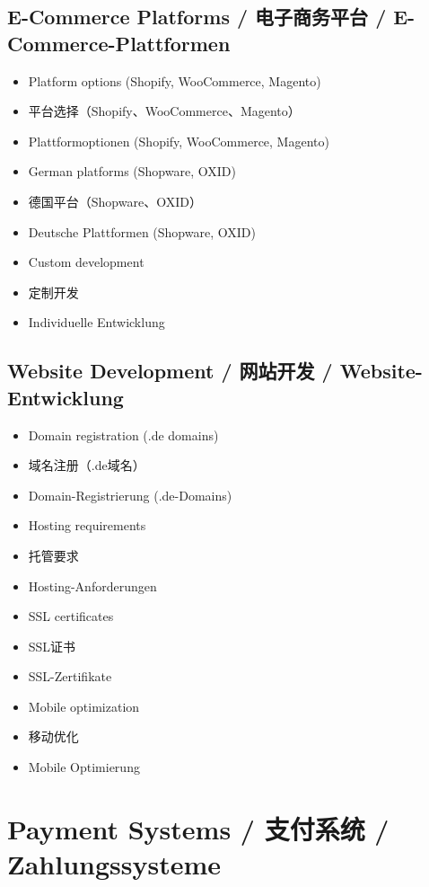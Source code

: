 \subsection{E-Commerce Platforms / 电子商务平台 / E-Commerce-Plattformen}
\begin{itemize}
    \item Platform options (Shopify, WooCommerce, Magento)
    \item 平台选择（Shopify、WooCommerce、Magento）
    \item Plattformoptionen (Shopify, WooCommerce, Magento)
    \item German platforms (Shopware, OXID)
    \item 德国平台（Shopware、OXID）
    \item Deutsche Plattformen (Shopware, OXID)
    \item Custom development
    \item 定制开发
    \item Individuelle Entwicklung
\end{itemize}

\subsection{Website Development / 网站开发 / Website-Entwicklung}
\begin{itemize}
    \item Domain registration (.de domains)
    \item 域名注册（.de域名）
    \item Domain-Registrierung (.de-Domains)
    \item Hosting requirements
    \item 托管要求
    \item Hosting-Anforderungen
    \item SSL certificates
    \item SSL证书
    \item SSL-Zertifikate
    \item Mobile optimization
    \item 移动优化
    \item Mobile Optimierung
\end{itemize}

\section{Payment Systems / 支付系统 / Zahlungssysteme}

